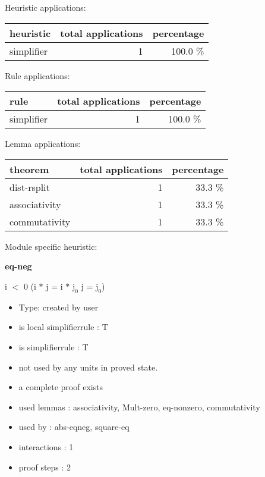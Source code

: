 \documentclass[a4paper]{article}
\begin{document}
\medskip


Heuristic applications:

\begin{supertabular}{l|r|r}
heuristic	& total applications & percentage \\ \hline
simplifier & 1 & 100.0 \% \\

\end{supertabular}

Rule applications:

\begin{supertabular}{l|r|r}
rule	        & total applications & percentage \\ \hline
simplifier & 1 & 100.0 \% \\

\end{supertabular}

Lemma applications:

\begin{supertabular}{l|r|r}
theorem	        & total applications & percentage \\ \hline
dist-rsplit & 1 & 33.3 \% \\
associativity & 1 & 33.3 \% \\
commutativity & 1 & 33.3 \% \\

\end{supertabular}

Module specific heuristic:

\pagebreak

{\LARGE\bf eq-neg}\label{lemma-eq-neg}

\medskip

 \Fol i $<$ 0 \Imp (i $*$ j = i $*$ $\mbox{j}_{0}$ \Equiv j = $\mbox{j}_{0}$)

\begin{itemize}

\item Type: created by user

\item is local simplifierrule : T
\item is simplifierrule : T
\item not used by any units in proved state.
\item       a complete proof exists
\item       used lemmas  : associativity, Mult-zero, eq-nonzero, commutativity
\item       used by      : abs-eqneg, square-eq
\item       interactions : 1
\item       proof steps  : 2
\end{itemize}
\end{document}
